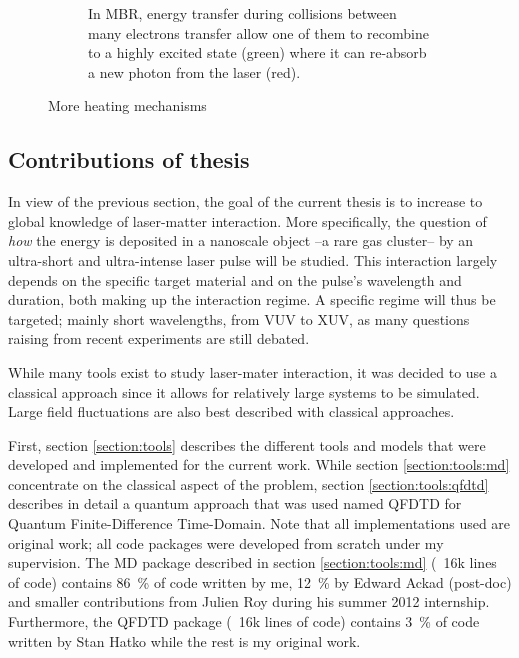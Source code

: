 \begin{figure}
\begin{subfigure}{0.48\columnwidth}
        \caption{In MBR, energy transfer during collisions between many
                 electrons transfer allow one of them to recombine to a highly
                 excited state (green) where it can re-absorb a new photon from
                 the laser (red).}
        \label{fig:heating:mbr}
    \end{subfigure}
 \caption{More heating mechanisms}
 \label{fig:heating}
\end{figure}






\subsection{Contributions of thesis}

In view of the previous section, the goal of the current thesis is to increase
to global knowledge of laser-matter interaction. More specifically, the
question of \textit{how} the energy is deposited in a nanoscale object
--a rare gas cluster-- by an
ultra-short and ultra-intense laser pulse will be studied. This interaction
largely depends on the specific target material and on the pulse's wavelength
and duration, both making up the interaction regime. A specific regime will
thus be targeted; mainly short wavelengths, from VUV to XUV, as many questions
raising from recent experiments are still debated.

While many tools exist to study laser-mater interaction, it was decided to use
a classical approach since it allows for relatively large systems to be
simulated. Large field fluctuations are also best described with
classical approaches\cite{Fennel2010}.


First, section \ref{section:tools} describes the different tools and models
that were developed and implemented for the current work. While section
\ref{section:tools:md} concentrate on the classical aspect of the problem,
section \ref{section:tools:qfdtd} describes in detail a quantum approach that
was used named QFDTD for Quantum Finite-Difference Time-Domain.
Note that all implementations used are original work; all code packages
were developed from scratch under my supervision. The MD package described in
section \ref{section:tools:md} (~16k lines of code) contains 86~\% of code
written by me, 12~\% by Edward Ackad (post-doc) and smaller contributions from
Julien Roy during his summer 2012 internship. Furthermore, the QFDTD package
(~16k lines of code) contains 3~\% of code written by Stan Hatko while the rest
is my original work.

